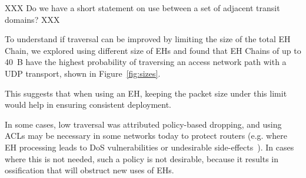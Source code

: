 \documentclass[conference]{IEEEtran}
\begin{document}

XXX Do we have a short statement on use between a set of adjacent transit domains? XXX

To understand if traversal can be improved by limiting the size of the total EH Chain, we explored using different size of EHs and found that EH Chains of up to 40~B   have the highest probability of traversing an access network path with a UDP transport, shown in Figure~\ref{fig:sizes}.

This suggests that when using an EH, keeping the packet size under this limit would help in ensuring consistent deployment.

In some cases, low traversal was attributed policy-based dropping, and using ACLs may be necessary in some networks today to protect routers (e.g. where EH processing leads to DoS vulnerabilities or undesirable side-effects~\cite{passive-threats}). In cases where this is not needed, such a policy is not desirable, because it results in ossification that will obstruct new uses of EHs.







\end{document}
